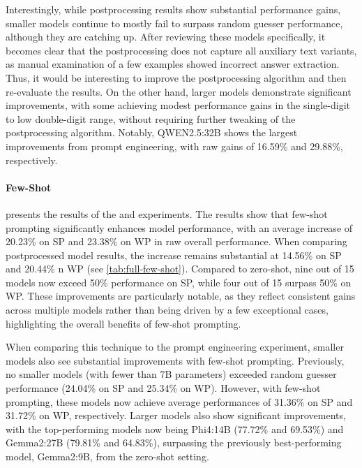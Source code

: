 Interestingly, while postprocessing results show substantial performance gains, smaller models continue to mostly fail to surpass random guesser performance, although they are catching up. After reviewing these models specifically, it becomes clear that the postprocessing does not capture all auxiliary text variants, as manual examination of a few examples showed incorrect answer extraction. Thus, it would be interesting to improve the postprocessing algorithm and then re-evaluate the results. On the other hand, larger models demonstrate significant improvements, with some achieving modest performance gains in the single-digit to low double-digit range, without requiring further tweaking of the postprocessing algorithm. Notably, QWEN2.5:32B shows the largest improvements from prompt engineering, with raw gains of 16.59\% and 29.88\%, respectively.

\paragraph{Few-Shot}
\label{par:few-shot}

 presents the results of the  and  experiments. The results show that few-shot prompting significantly enhances model performance, with an average increase of 20.23\% on \ac{SP} and 23.38\% on \ac{WP} in raw overall performance. When comparing postprocessed model results, the increase remains substantial at 14.56\% on \ac{SP} and 20.44\% n \ac{WP} (see \cref{tab:full-few-shot}). Compared to zero-shot, nine out of 15 models now exceed 50\% performance on \ac{SP}, while four out of 15 surpass 50\% on \ac{WP}. These improvements are particularly notable, as they reflect consistent gains across multiple models rather than being driven by a few exceptional cases, highlighting the overall benefits of few-shot prompting.

When comparing this technique to the prompt engineering experiment, smaller models also see substantial improvements with few-shot prompting. Previously, no smaller models (with fewer than 7B parameters) exceeded random guesser performance (24.04\% on \ac{SP} and 25.34\% on \ac{WP}). However, with few-shot prompting, these models now achieve average performances of 31.36\% on \ac{SP} and 31.72\% on \ac{WP}, respectively. Larger models also show significant improvements, with the top-performing models now being Phi4:14B (77.72\% and 69.53\%) and Gemma2:27B (79.81\% and 64.83\%), surpassing the previously best-performing model, Gemma2:9B, from the zero-shot setting.

